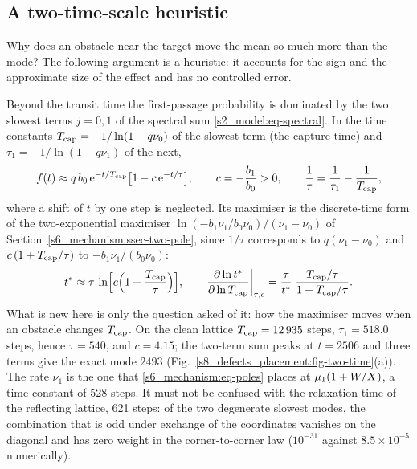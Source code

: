 \subsection{A two-time-scale heuristic}\label{sup_defects:ssec-twotime}

Why does an obstacle near the target move the mean so much more than the mode? The following argument is a
heuristic: it accounts for the sign and the approximate size of the effect and has no controlled error.

Beyond the transit time the first-passage probability is dominated by the two slowest terms $j=0,1$ of the
spectral sum \eqref{s2_model:eq-spectral}. In the time constants $T_{\mathrm{cap}}=-1/\ln(1-q\nu_0)$ of the slowest term (the
capture time) and $\tau_1=-1/\ln(1-q\nu_1)$ of the next,
\begin{equation}\label{s8_defects_placement:eq-two-time-form}
  f(t)\approx q\,b_0\,\mathrm{e}^{-t/T_{\mathrm{cap}}}\bigl[1-c\,\mathrm{e}^{-t/\tau}\bigr],\qquad c=-\frac{b_1}{b_0}>0,\qquad
  \frac1\tau=\frac1{\tau_1}-\frac1{T_{\mathrm{cap}}},
\end{equation}
where a shift of $t$ by one step is neglected. Its maximiser is the discrete-time form of the two-exponential
maximiser $\ln(-b_1\nu_1/b_0\nu_0)/(\nu_1-\nu_0)$ of Section~\ref{s6_mechanism:ssec-two-pole}, since
$1/\tau$ corresponds to $q(\nu_1-\nu_0)$ and $c\,(1+T_{\mathrm{cap}}/\tau)$ to $-b_1\nu_1/(b_0\nu_0)$:
\begin{equation}\label{s8_defects_placement:eq-two-time}
  t^{*}\approx\tau\,\ln\Bigl[c\Bigl(1+\frac{T_{\mathrm{cap}}}{\tau}\Bigr)\Bigr],\qquad
  \frac{\partial\ln t^{*}}{\partial\ln T_{\mathrm{cap}}}\bigg|_{\tau,c}=\frac{\tau}{t^{*}}\;\frac{T_{\mathrm{cap}}/\tau}{1+T_{\mathrm{cap}}/\tau}.
\end{equation}
What is new here is only the question asked of it: how the maximiser moves when an obstacle changes $T_{\mathrm{cap}}$.
On the clean lattice $T_{\mathrm{cap}}=12\,935$ steps, $\tau_1=518.0$ steps, hence $\tau=540$, and $c=4.15$; the two-term sum
peaks at $t=2506$ and three terms give the exact mode $2493$ (Fig.~\ref{s8_defects_placement:fig-two-time}(a)).
The rate $\nu_1$ is the one that \eqref{s6_mechanism:eq-poles} places at $\mu_{1}(1+W/X)$, a time constant of 528
steps. It must not be confused with the relaxation time of the reflecting lattice, 621 steps: of the two
degenerate slowest modes, the combination that is odd under exchange of the coordinates vanishes on the diagonal
and has zero weight in the corner-to-corner law ($10^{-31}$ against $8.5\times10^{-5}$ numerically).

